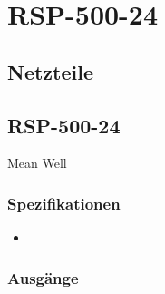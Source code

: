 %
%
%




\chapter{RSP-500-24}

\section{Netzteile}

\section{RSP-500-24}
Mean Well

\subsection{Spezifikationen}

\begin{itemize}
	
\item 

\end{itemize}

\subsection{Ausgänge}